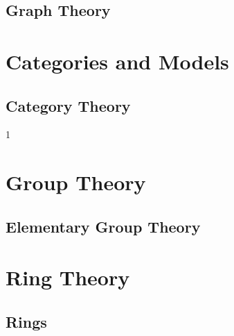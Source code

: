 \documentclass{book}                                                           %
\def\compilealgebra{0}
\begin{document}
                \chapter{Graph Theory}
                    \renewcommand{\PATH}{\PARPATH/Graph_Theory}
                    \label{chapt:Graph_Theory}%
                    
            \part{Categories and Models}
                \renewcommand{\PARPATH}{\TOPPATH/Categories_and_Models}
                \chapter{Category Theory}
                    \renewcommand{\PATH}{\PARPATH}
                    \label{chapt:Category_Theory}%
                    
        \clearpage
        \setcounter{endpage}{\thepage}
    \fi

    \if\compilealgebra1
            \renewcommand{\TOPPATH}{books/Algebra}
            \label{book:Algebra}%
            \setcounter{page}{\value{endpage}}
            \part{Group Theory}
                \renewcommand{\PARPATH}{\TOPPATH/Group_Theory}
                \chapter{Elementary Group Theory}
                    \renewcommand{\PATH}{\PARPATH/Elementary_Group_Theory}
                    \label{chapt:Elementary_Group_Theory}%
                    
                    
                    
                    
                    
            \part{Ring Theory}
                \renewcommand{\PARPATH}{\TOPPATH/Ring_Theory}
                \chapter{Rings}
                    \renewcommand{\PATH}{\PARPATH/Elementary_Ring_Theory}
                    
                    
\end{document}
